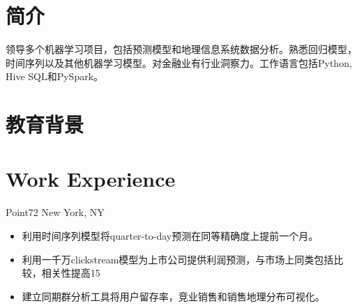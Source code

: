\documentclass[11pt,a4paper,roman]{moderncv} %
\begin{document}
\makecvtitle %

\section{简介}  {\small 领导多个机器学习项目，包括预测模型和地理信息系统数据分析。熟悉回归模型，时间序列以及其他机器学习模型。对金融业有行业洞察力。工作语言包括Python, Hive SQL和PySpark。}

\section{教育背景}


\section{Work Experience}
{Point72}
{New York, NY}{}
{\begin{itemize}  %
	\item 利用时间序列模型将quarter-to-day预测在同等精确度上提前一个月。
	\item 利用一千万clickstream模型为上市公司提供利润预测，与市场上同类包括比较，相关性提高15%
	\item 建立同期群分析工具将用户留存率，竞业销售和销售地理分布可视化。
\end{itemize}}
\end{document}
